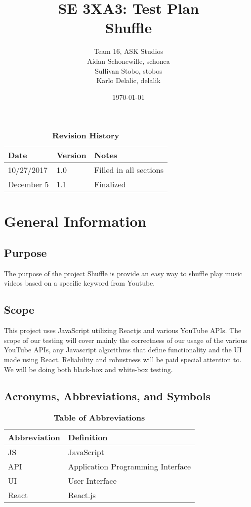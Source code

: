 \documentclass[12pt, titlepage]{article}
\title{SE 3XA3: Test Plan\\Shuffle}
\author{Team 16, ASK Studios
		\\ Aidan Schonewille, schonea
		\\ Sullivan Stobo, stobos
		\\ Karlo Delalic, delalik
}
\date{\today}
\begin{document}
\maketitle
{}

\newpage
\begin{table}[bp]
\caption{\bf Revision History}
\begin{tabularx}{\textwidth}{p{3cm}p{2cm}X}
\toprule {\bf Date} & {\bf Version} & {\bf Notes}\\
\midrule
10/27/2017 & 1.0 & Filled in all sections\\
December 5 & 1.1 & Finalized\\
\bottomrule
\end{tabularx}
\end{table}
\newpage

\tableofcontents
\listoftables

\newpage


\section{General Information}

\subsection{Purpose}

\color{red} The purpose of the project Shuffle is provide an easy way to shuffle play music videos based on a specific keyword from Youtube. \color{black}

\subsection{Scope}

This project uses JavaScript utilizing Reactjs and various YouTube APIs.  The scope of our testing will cover mainly the correctness of our usage of the various YouTube APIs, any Javascript algorithms that define functionality and the UI made using React.  Reliability and robustness will be paid special attention to.  We will be doing both black-box and white-box testing.

\subsection{Acronyms, Abbreviations, and Symbols}
	
\begin{table}[hbp]
\caption{\textbf{Table of Abbreviations}} \label{Table}

\begin{tabularx}{\textwidth}{p{3cm}X}
\toprule
\textbf{Abbreviation} & \textbf{Definition} \\
\midrule
JS & JavaScript\\
API & Application Programming Interface\\
UI & User Interface\\
React & React.js\\
\bottomrule
\end{tabularx}

\end{table}
\end{document}
